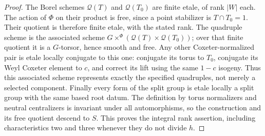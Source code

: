 \begin{proof}
The Borel schemes $\mathcal Q(T)$ and $\mathcal Q(T_0)$ are finite
etale, of rank $|W|$ each.  The action of $\Phi$ on their product
is free, since a point stabilizer is $T\cap T_0=1$.  Their
quotient is therefore finite etale, with the stated rank.  The
quadruple scheme is the associated scheme
$G\times^\Phi(\mathcal Q(T)\times\mathcal Q(T_0))$; over that
finite quotient it is a $G$-torsor, hence smooth and free.
Any other Coxeter-normalized pair is etale locally conjugate to
this one: conjugate its torus to $T_0$, conjugate its Weyl Coxeter
element to $c$, and correct its lift using the same $1-c$
isogeny.  Thus this associated scheme represents exactly the
specified quadruples, not merely a selected component.
Finally every form of the split group is etale locally a split
group with the same based root datum.  The definition by torus
normalizers and neutral centralizers is invariant under all
automorphisms, so the construction and its free quotient descend
to $S$.  This proves the integral rank assertion, including
characteristics two and three whenever they do not divide $h$.
\end{proof}

